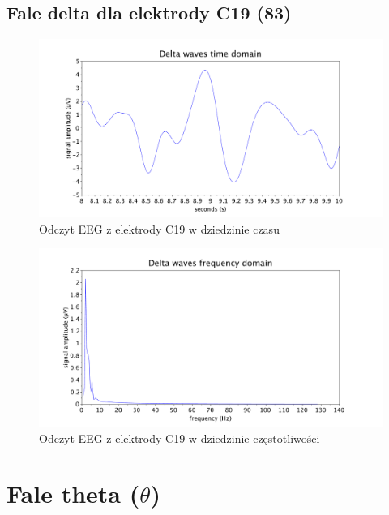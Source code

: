 \documentclass{article}
\begin{document}
    \subsection{Fale delta dla elektrody C19 (83)}
    \begin{figure}[H]
        \hspace*{-1.5cm} 
        \includegraphics[width=\linewidth+3cm]{delta_time.pdf}
        \caption{Odczyt EEG z elektrody C19 w dziedzinie czasu}
    \end{figure}
    \begin{figure}[H]
        \hspace*{-1.5cm}
        \includegraphics[width=\linewidth+3cm]{delta_freq.pdf}
        \caption{Odczyt EEG z elektrody C19 w dziedzinie częstotliwości}
    \end{figure}

\newpage
\section{Fale theta ($\theta$)}
\end{document}
